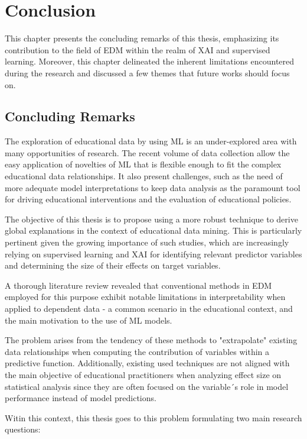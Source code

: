 \chapter{Conclusion}
\label{chap: conclusion}

This chapter presents the concluding remarks of this thesis, emphasizing its contribution to the field of EDM within the realm of XAI and supervised learning. Moreover, this chapter delineated the inherent limitations encountered during the research and discussed a few themes that future works should focus on.

\section{Concluding Remarks}

The exploration of educational data by using ML is an under-explored area with many opportunities of research. The recent volume of data collection allow the easy application of novelties of ML that is flexible enough to fit the complex educational data relationships. It also present challenges, such as the need of more adequate model interpretations to keep data analysis as the paramount tool for driving educational interventions and the evaluation of educational policies.  

The objective of this thesis is to propose using a more robust technique to derive global explanations in the context of educational data mining. This is particularly pertinent given the growing importance of such studies, which are increasingly relying on supervised learning and XAI for identifying relevant predictor variables and determining the size of their effects on target variables.

A thorough literature review revealed that conventional methods in EDM employed for this purpose exhibit notable limitations in interpretability when applied to dependent data - a common scenario in the educational context, and the main motivation to the use of ML models. 

The problem arises from the tendency of these methods to "extrapolate" existing data relationships when computing the contribution of variables within a predictive function. Additionally, existing used techniques are not aligned with the main objective of educational practitioners when analyzing effect size on statistical analysis since they are often focused on the variable´s role in model performance instead of model predictions.

Witin this context, this thesis goes to this problem formulating two main research questions:


